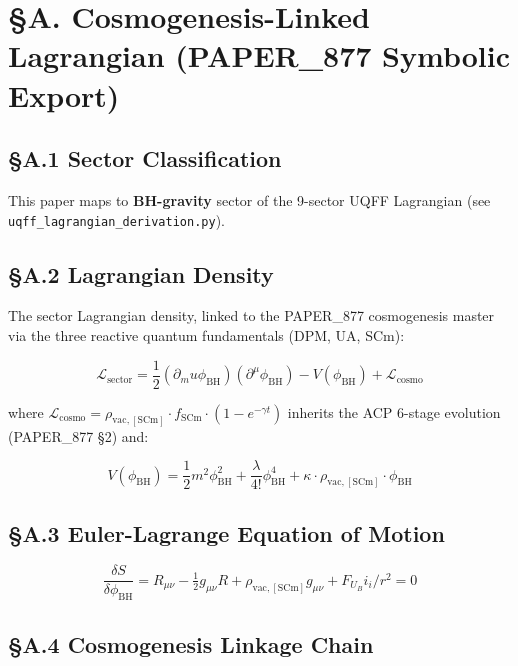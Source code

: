 \documentclass[12pt,a4paper]{article}
\begin{document}
\section{\S{}A. Cosmogenesis-Linked Lagrangian (PAPER\_877 Symbolic Export)}

\subsection{\S{}A.1 Sector Classification}

This paper maps to \textbf{BH-gravity} sector of the 9-sector UQFF Lagrangian (see \texttt{uqff\_{lagrangian\_derivation}.py}).

\subsection{\S{}A.2 Lagrangian Density}

The sector Lagrangian density, linked to the PAPER\_877 cosmogenesis master via the three reactive quantum fundamentals (DPM, UA, SCm):

\begin{equation}
\mathcal{L}_{\mathrm{sector}} = \frac{1}{2}(\partial_mu \phi_{\mathrm{BH}})(\partial^\mu \phi_{\mathrm{BH}}) - V(\phi_{\mathrm{BH}}) + \mathcal{L}_{\mathrm{cosmo}}
\end{equation}

where $\mathcal{L}_{\mathrm{cosmo}} = \rho_{\mathrm{vac,[SCm]}} \cdot f_{\mathrm{SCm}} \cdot (1 - e^{-\gamma t})$ inherits the ACP 6-stage evolution (PAPER\_877 \S{}2) and:

\begin{equation}
V(\phi_{\mathrm{BH}}) = \frac{1}{2} m^2 \phi_{\mathrm{BH}}^2 + \frac{\lambda}{4!} \phi_{\mathrm{BH}}^4 + \kappa \cdot \rho_{\mathrm{vac,[SCm]}} \cdot \phi_{\mathrm{BH}}
\end{equation}

\subsection{\S{}A.3 Euler-Lagrange Equation of Motion}

\begin{equation}
\boxed{\frac{\delta S}{\delta \phi_{\mathrm{BH}}} = R_{\mu\nu} - \tfrac{1}{2}g_{\mu\nu}R + \rho_{\mathrm{vac,[SCm]}} g_{\mu\nu} + F_U_Bi_i/r^2 = 0}
\end{equation}

\subsection{\S{}A.4 Cosmogenesis Linkage Chain}
\end{document}
